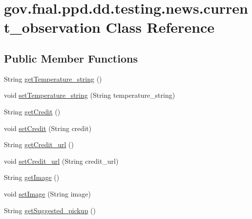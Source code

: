 \hypertarget{classgov_1_1fnal_1_1ppd_1_1dd_1_1testing_1_1news_1_1current__observation}{\section{gov.\-fnal.\-ppd.\-dd.\-testing.\-news.\-current\-\_\-observation Class Reference}
\label{classgov_1_1fnal_1_1ppd_1_1dd_1_1testing_1_1news_1_1current__observation}
}
\subsection*{Public Member Functions}
\begin{DoxyCompactItemize}
\item 
String \hyperlink{classgov_1_1fnal_1_1ppd_1_1dd_1_1testing_1_1news_1_1current__observation_a155455b56109457ccdd026ff2e157694}{get\-Temperature\-\_\-string} ()
\item 
void \hyperlink{classgov_1_1fnal_1_1ppd_1_1dd_1_1testing_1_1news_1_1current__observation_a13eb041ca00d2aa0b504e55f1e3ec605}{set\-Temperature\-\_\-string} (String temperature\-\_\-string)
\item 
String \hyperlink{classgov_1_1fnal_1_1ppd_1_1dd_1_1testing_1_1news_1_1current__observation_a8abe0ff3871c5110c68253657119db57}{get\-Credit} ()
\item 
void \hyperlink{classgov_1_1fnal_1_1ppd_1_1dd_1_1testing_1_1news_1_1current__observation_a6c7f750288c7d10e57235c11ca4904a7}{set\-Credit} (String credit)
\item 
String \hyperlink{classgov_1_1fnal_1_1ppd_1_1dd_1_1testing_1_1news_1_1current__observation_a9877900d7ff528aed305c692bd5119bd}{get\-Credit\-\_\-url} ()
\item 
void \hyperlink{classgov_1_1fnal_1_1ppd_1_1dd_1_1testing_1_1news_1_1current__observation_aa7aca1b80ca7922849de2168ca1af21a}{set\-Credit\-\_\-url} (String credit\-\_\-url)
\item 
String \hyperlink{classgov_1_1fnal_1_1ppd_1_1dd_1_1testing_1_1news_1_1current__observation_a6dbccf420b1a74357ab8d1e407eae5e3}{get\-Image} ()
\item 
void \hyperlink{classgov_1_1fnal_1_1ppd_1_1dd_1_1testing_1_1news_1_1current__observation_a034400dd329b068f3248eb52a15ed3f3}{set\-Image} (String image)
\item 
String \hyperlink{classgov_1_1fnal_1_1ppd_1_1dd_1_1testing_1_1news_1_1current__observation_a6efb79612462a971522432a6bb2c8fbd}{get\-Suggested\-\_\-pickup} ()

\end{DoxyCompactItemize}
